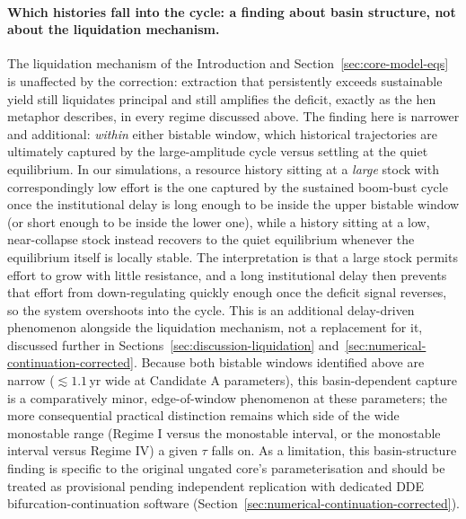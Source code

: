 \documentclass[twocolumn,10pt]{article}
\begin{document}
\paragraph{Which histories fall into the cycle: a finding about basin structure, not about the liquidation mechanism.}
\label{sec:basin-capture}
The liquidation mechanism of the Introduction and Section~\ref{sec:core-model-eqs} is unaffected by the correction: extraction that persistently exceeds sustainable yield still liquidates principal and still amplifies the deficit, exactly as the hen metaphor describes, in every regime discussed above. The finding here is narrower and additional: \emph{within} either bistable window, which historical trajectories are ultimately captured by the large-amplitude cycle versus settling at the quiet equilibrium. In our simulations, a resource history sitting at a \emph{large} stock with correspondingly low effort is the one captured by the sustained boom-bust cycle once the institutional delay is long enough to be inside the upper bistable window (or short enough to be inside the lower one), while a history sitting at a low, near-collapse stock instead recovers to the quiet equilibrium whenever the equilibrium itself is locally stable. The interpretation is that a large stock permits effort to grow with little resistance, and a long institutional delay then prevents that effort from down-regulating quickly enough once the deficit signal reverses, so the system overshoots into the cycle. This is an additional delay-driven phenomenon alongside the liquidation mechanism, not a replacement for it, discussed further in Sections~\ref{sec:discussion-liquidation} and~\ref{sec:numerical-continuation-corrected}. Because both bistable windows identified above are narrow ($\lesssim1.1$\,yr wide at Candidate A parameters), this basin-dependent capture is a comparatively minor, edge-of-window phenomenon at these parameters; the more consequential practical distinction remains which side of the wide monostable range (Regime I versus the monostable interval, or the monostable interval versus Regime IV) a given $\tau$ falls on. As a limitation, this basin-structure finding is specific to the original ungated core's parameterisation and should be treated as provisional pending independent replication with dedicated DDE bifurcation-continuation software (Section~\ref{sec:numerical-continuation-corrected}).
\end{document}
